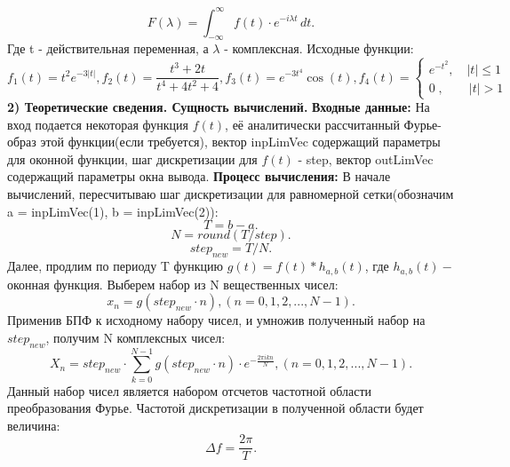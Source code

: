 \documentclass[11pt]{article}
\begin{document}
	{\[F(\lambda) = \int_{-\infty}^{\infty}f(t)\cdot e^{-i\lambda t}\,dt. \]}
	\newline 
	\newline
	{Где t - действительная переменная, а $\lambda$ - комплексная. Исходные функции:}		
	\newline 
	\[f_1(t) = t^2 e^{-3|t|}, f_2(t)=\frac{t^3+2t}{t^4 + 4t^2 + 4}, f_3(t) = e^{-3t^4}\cos(t), f_4(t) = \begin{cases}
	e^{-t^2}, \quad {|t| \leq 1}\\
	0 \; ,\qquad{|t| > 1}
	\end{cases} \]
	\newline
	\newline
	{\hspace*{-0.4cm}\bf \Large 2) Теоретические сведения. Сущность вычислений.}
	\newline
	\newline
	{\hspace{-0.6cm}\bf Входные данные:}
	\newline
	{\hspace{-0.6cm} На вход подается некоторая функция $f(t)$, её аналитически рассчитанный Фурье-образ этой функции(если требуется), вектор inpLimVec содержащий параметры для оконной функции, шаг дискретизации для $f(t)$  - step, вектор outLimVec содержащий параметры окна вывода. }
	\newline
	\newline
	{\hspace{-0.6cm}\bf Процесс вычисления:}	
	\newline
	{\hspace{-0.6cm} В начале вычислений, пересчитываю шаг дискретизации для равномерной сетки(обозначим a = inpLimVec(1), b = inpLimVec(2)):
	\newline
	\[T = b - a.   \]
	\[N = round(T/step).\]
	\[step_{new} = T/N.\]
	}
	\newline
	{Далее, продлим по периоду T функцию $g(t) = f(t)*h_{a,b}(t)$, где $h_{a,b}(t) -$оконная функция. Выберем набор из N вещественных чисел:}
	\newline
	\[x_n = g(step_{new}\cdot n),(n = 0,1,2,...,N - 1). \]
	\newline
	\newline
	{Применив БПФ к исходному набору чисел, и умножив полученный набор на $step_{new}$, получим N комплексных чисел:}
	\newline
	\[X_n = step_{new} \cdot \sum\limits_{k=0}^{N-1} g(step_{new} \cdot n) \cdot e^{-\frac{2\pi i k n}{N}},(n = 0,1,2,...,N - 1). \]
	\newline
	\newline
	{Данный набор чисел является набором отсчетов частотной области преобразования Фурье. Частотой дискретизации в полученной области будет величина:}
	\newline
	\[\Delta f = \frac{2\pi}{T}.\] 
	
\end{document}
